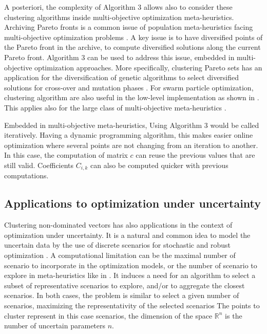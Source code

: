 \documentclass{meta}
\def\RR{{\mathbb{R}}}
\begin{document}
A posteriori, the complexity of Algorithm 3 allows also to consider these clustering algorithms inside multi-objective optimization meta-heuristics.
Archiving Pareto fronts is a common issue of population meta-heuristics facing multi-objective optimization problems \cite{talbi2009metaheuristics}.
A key issue is to have diversified points of the Pareto front in the archive, to compute diversified solutions along the current Pareto front.
Algorithm 3 can be used to address this issue, embedded in multi-objective optimization approaches.
More specifically, clustering Pareto sets has an application for the diversification of genetic algorithms to select diversified solutions for cross-over and mutation phases \cite{zio2011clustering}.
For swarm particle optimization, clustering algorithm are also useful in the low-level implementation as shown in \cite{pulido2004using}.
This applies also for the large class of  multi-objective meta-heuristics \cite{talbi2012multi}.

Embedded in multi-objective meta-heuristics, Using Algorithm 3 would be called iteratively.
Having a dynamic programming algorithm, this makes easier online optimization where several points are not changing from an iteration to another.
In this case, the computation of matrix $c$ can reuse the previous values that are still valid.
Coefficients $C_{i,k}$ can also be computed quicker with previous computations.


\subsection{Applications to optimization under uncertainty}

Clustering non-dominated vectors has also applications in the context of optimization under uncertainty.
It is a natural and common idea to model the uncertain data by the use of discrete scenarios for stochastic and robust optimization 
\cite{rockafellar1991scenarios,kasperski2016robust}.
A computational limitation can be the maximal number of scenario to incorporate in the optimization models,
or the number of scenario to explore in meta-heuristics like in \cite{haugen2001progressive}.
It induces a need for an algorithm to select a subset of representative scenarios to explore,
and/or to aggregate the closest scenarios.
In both cases, the problem is similar to select a given number of scenarios, maximizing the representativity of the selected scenarios
The points to cluster represent in this case scenarios, the dimension of the space $\RR^n$ is the number of uncertain parameters $n$.
\end{document}
